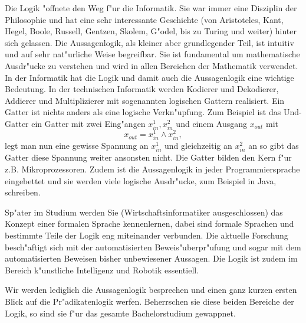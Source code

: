 Die Logik "offnete den Weg f"ur die Informatik. Sie war immer eine Disziplin der Philosophie und hat eine sehr interessante Geschichte (von Aristoteles, Kant, Hegel, Boole, Russell, Gentzen, Skolem, G"odel, bis zu Turing und weiter) hinter sich gelassen. Die Aussagenlogik, als kleiner aber grundlegender Teil, ist intuitiv und auf sehr nat"urliche Weise begreifbar. Sie ist fundamental um mathematische Ausdr"ucke zu verstehen und wird in allen Bereichen der Mathematik verwendet. In der Informatik hat die Logik und damit auch die Aussagenlogik eine wichtige Bedeutung. In der technischen Informatik werden Kodierer und Dekodierer, Addierer und Multiplizierer mit sogenannten logischen Gattern realisiert. Ein Gatter ist nichts anders als eine logische Verkn"upfung. Zum Beispiel ist das Und-Gatter ein Gatter mit zwei Eing"angen $x_{in}^1, x_{in}^2$ und einem Ausgang $x_{out}$ mit 
\begin{equation*}
	x_{out} = x_{in}^1 \land x_{in}^2,
\end{equation*}
legt man nun eine gewisse Spannung an $x_{in}^1$ und gleichzeitig an $x_{in}^2$ an so gibt das Gatter diese Spannung weiter ansonsten nicht. Die Gatter bilden den Kern f"ur z.B. Mikroprozessoren. Zudem ist die Aussagenlogik in jeder Programmiersprache eingebettet und sie werden viele logische Ausdr"ucke, zum Beispiel in Java, schreiben.

Sp"ater im Studium werden Sie (Wirtschaftsinformatiker ausgeschlossen) das Konzept einer formalen Sprache kennenlernen, dabei sind formale Sprachen und bestimmte Teile der Logik eng miteinander verbunden. Die aktuelle Forschung besch"aftigt sich mit der automatisierten Beweis"uberpr"ufung und sogar mit dem automatisierten Beweisen bisher unbewiesener Aussagen. Die Logik ist zudem im Bereich k"unstliche Intelligenz und Robotik essentiell.

Wir werden lediglich die Aussagenlogik besprechen und einen ganz kurzen ersten Blick auf die Pr"adikatenlogik werfen. Beherrschen sie diese beiden Bereiche der Logik, so sind sie f"ur das gesamte Bachelorstudium gewappnet.


